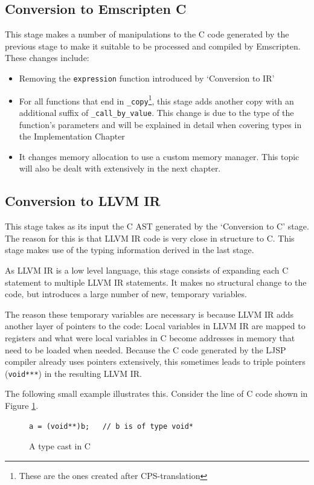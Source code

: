 \documentclass[11pt]{report}
\begin{document}
\subsection{Conversion to Emscripten C}
This stage makes a number of manipulations to the C code generated by the previous stage to make it suitable to be processed and compiled by Emscripten. These changes include:
\begin{itemize}
\item Removing the \texttt{expression} function introduced by `Conversion to IR'
\item For all functions that end in \texttt{_copy}\footnote{These are the ones created after CPS-translation}, this stage adds another copy with an additional suffix of \texttt{_call_by_value}. This change is due to the type of the function's parameters and will be explained in detail when covering types in the Implementation Chapter
\item It changes memory allocation to use a custom memory manager. This topic will also be dealt with extensively in the next chapter.
\end{itemize}

\subsection{Conversion to LLVM IR}
This stage takes as its input the C AST generated by the `Conversion to C' stage. The reason for this is that LLVM IR code is very close in structure to C. This stage makes use of the typing information derived in the last stage.

As LLVM IR is a low level language, this stage consists of expanding each C statement to multiple LLVM IR statements. It makes no structural change to the code, but introduces a large number of new, temporary variables.

The reason these temporary variables are necessary is because LLVM IR adds another layer of pointers to the code: Local variables in LLVM IR are mapped to registers and what were local variables in C become addresses in memory that need to be loaded when needed. Because the C code generated by the LJSP compiler already uses pointers extensively, this sometimes leads to triple pointers (\texttt{void***}) in the resulting LLVM IR.

The following small example illustrates this. Consider the line of C code shown in Figure \ref{convllvmir1}.
\begin{figure}[ht]
\begin{lstlisting}
a = (void**)b;   // b is of type void*
\end{lstlisting}
\caption{A type cast in C}
\label{convllvmir1}
\end{figure}
\end{document}
